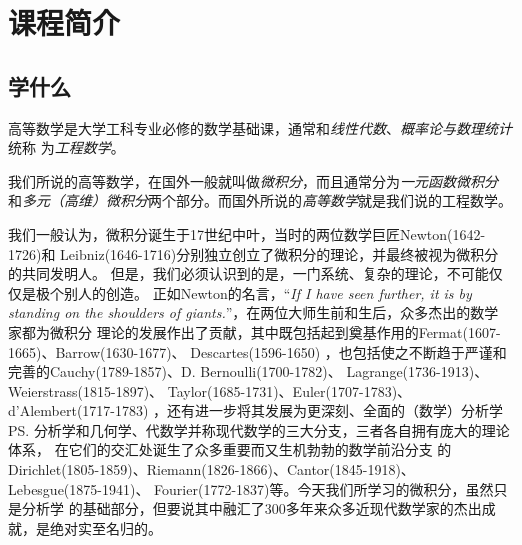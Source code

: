 
\setcounter{chapter}{-1}

\chapter{课程简介}

\section{学什么}

高等数学是大学工科专业必修的数学基础课，通常和{\it 线性代数}、{\it 概率论与数理统计}统称
为{\it 工程数学}。

我们所说的高等数学，在国外一般就叫做{\it 微积分}，而且通常分为{\it 一元函数微积分}
和{\it 多元（高维）微积分}两个部分。而国外所说的{\it 高等数学}就是我们说的工程数学。

我们一般认为，微积分诞生于17世纪中叶，当时的两位数学巨匠Newton(1642-1726)和
Leibniz(1646-1716)分别独立创立了微积分的理论，并最终被视为微积分的共同发明人。
但是，我们必须认识到的是，一门系统、复杂的理论，不可能仅仅是极个别人的创造。
正如Newton的名言，“{\it If I have seen further, it is by standing on 
the shoulders of giants.}”，在两位大师生前和生后，众多杰出的数学家都为微积分
理论的发展作出了贡献，其中既包括起到奠基作用的Fermat(1607-1665)、Barrow(1630-1677)、
Descartes(1596-1650)%
，也包括使之不断趋于严谨和完善的Cauchy(1789-1857)、D. Bernoulli(1700-1782)、
Lagrange(1736-1913)、Weierstrass(1815-1897)、
Taylor(1685-1731)、Euler(1707-1783)、d'Alembert(1717-1783)
，还有进一步将其发展为更深刻、全面的{\kaishu （数学）分析学}
\ps{分析学和几何学、代数学并称现代数学的三大分支，三者各自拥有庞大的理论体系，
在它们的交汇处诞生了众多重要而又生机勃勃的数学前沿分支}
的
Dirichlet(1805-1859)、Riemann(1826-1866)、Cantor(1845-1918)、
Lebesgue(1875-1941)、
Fourier(1772-1837)等。今天我们所学习的微积分，虽然只是分析学
的基础部分，但要说其中融汇了300多年来众多近现代数学家的杰出成就，是绝对实至名归的。



